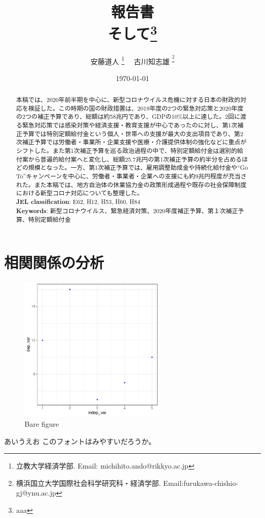 \documentclass[12pt,a4paper]{article}
\author{安藤道人
\thanks{立教大学経済学部. Email: michihito.ando@rikkyo.ac.jp}  \ \  古川知志雄
\textsuperscript\thanks{横浜国立大学国際社会科学研究科・経済学部. Email:furukawa-chishio-gj@ynu.ac.jp}}
\title{\vspace{-0ex}報告書 \\ そして\thanks{aaa}}
\date{\today}
\begin{document}
\renewcommand\footnotelayout{\small}

\maketitle

\vspace{-10pt}\begin{abstract}
\begin{spacing}{1}
\noindent 
本稿では、2020年前半期を中心に、新型コロナウイルス危機に対する日本の財政的対応を検証した。この時期の国の財政措置は、2019年度の2つの緊急対応策と2020年度の2つの補正予算であり、総額は約58兆円であり、GDPの10\%以上に達した。2回に渡る緊急対応策では感染対策や経済支援・教育支援が中心であったのに対し、第1次補正予算では特別定額給付金という個人・世帯への支援が最大の支出項目であり、第2次補正予算では労働者・事業所・企業支援や医療・介護提供体制の強化などに重点がシフトした。また第1次補正予算を巡る政治過程の中で、特別定額給付金は選別的給付案から普遍的給付案へと変化し、総額25.7兆円の第1次補正予算の約半分を占めるほどの規模となった。一方、第1次補正予算では、雇用調整助成金や持続化給付金や``Go To''キャンペーンを中心に、労働者・事業者・企業への支援にも約9兆円程度が充当された。また本稿では、地方自治体の休業協力金の政策形成過程や既存の社会保障制度における新型コロナ対応についても整理した。\\

\noindent\textbf{JEL classification}: E62, H12, H53, H60, H84  \\
\noindent\textbf{Keywords}: 新型コロナウイルス、緊急経済対策、2020年度補正予算、第１次補正予算、特別定額給付金
\end{spacing}
\end{abstract}

\newpage

\section{相関関係の分析} 


\begin{figure}
\centering
\includegraphics[width=7cm]{04_analyze/scatter_regress/figure/figure.pdf}

\label{fig:img1}
\caption{Bare figure}
\end{figure}


あいうえお
このフォントはみやすいだろうか。



\end{document}
